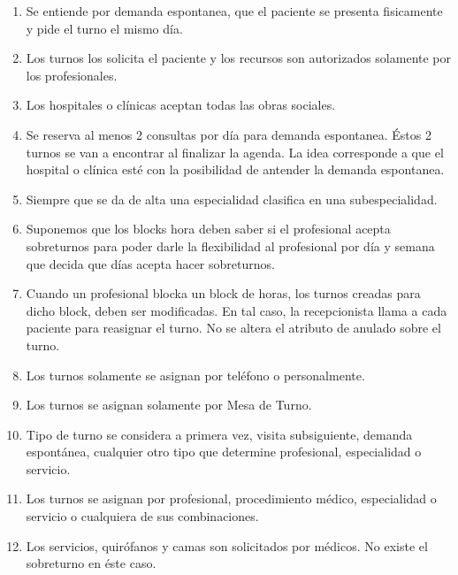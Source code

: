 \documentclass[a4paper,11pt]{article}
\begin{document}
\begin{enumerate}

    \item Se entiende por demanda espontanea, que el paciente se presenta 
    fisicamente y pide el turno el mismo día.
    
    \item Los turnos los solicita el paciente y los recursos son autorizados 
    solamente por los profesionales.
    
    \item Los hospitales o clínicas aceptan todas las obras sociales.
    
    \item Se reserva al menos 2 consultas por día para demanda espontanea.
    Éstos 2 turnos se van a encontrar al finalizar la agenda. La idea corresponde
    a que el hospital o clínica esté con la posibilidad de antender la demanda
    espontanea.
    
    \item Siempre que se da de alta una especialidad clasifica en una subespecialidad.
    
    \item Suponemos que los blocks hora deben saber si el profesional acepta 
    sobreturnos para poder darle la flexibilidad al profesional por día y semana 
    que decida que días acepta hacer sobreturnos.
    
    \item Cuando un profesional blocka un block de horas, los turnos creadas 
    para dicho block, deben ser modificadas. En tal caso, la recepcionista llama
    a cada paciente para reasignar el turno. No se altera el atributo de anulado 
    sobre el turno.
    
    \item Los turnos solamente se asignan por teléfono o personalmente.
    
    \item Los turnos se asignan solamente por Mesa de Turno.
    
    \item Tipo de turno se considera a primera vez, visita subsiguiente, demanda 
    espontánea, cualquier otro 
    tipo que determine profesional, especialidad o servicio.
    
    \item Los turnos se asignan por profesional, procedimiento médico, especialidad
    o servicio o cualquiera de sus combinaciones.
    
    \item Los servicios, quirófanos y camas son solicitados por médicos. No existe 
    el sobreturno en éste caso.
    

\end{enumerate}
\end{document}
